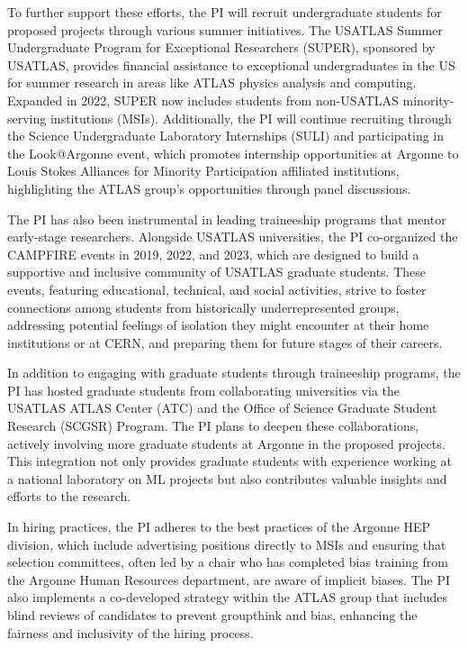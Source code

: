\documentclass[letter, USenglish, 11pt, subfigure]{article}
\begin{document}
To further support these efforts, the PI will recruit undergraduate students for proposed projects through various summer initiatives. The USATLAS Summer Undergraduate Program for Exceptional Researchers (SUPER), sponsored by USATLAS, provides financial assistance to exceptional undergraduates in the US for summer research in areas like ATLAS physics analysis and computing. Expanded in 2022, SUPER now includes students from non-USATLAS minority-serving institutions (MSIs). Additionally, the PI will continue recruiting through the Science Undergraduate Laboratory Internships (SULI) and participating in the Look@Argonne event, which promotes internship opportunities at Argonne to Louis Stokes Alliances for Minority Participation affiliated institutions, highlighting the ATLAS group’s opportunities through panel discussions.

The PI has also been instrumental in leading traineeship programs that mentor early-stage researchers. Alongside USATLAS universities, the PI co-organized the CAMPFIRE events in 2019, 2022, and 2023, which are designed to build a supportive and inclusive community of USATLAS graduate students. These events, featuring educational, technical, and social activities, strive to foster connections among students from historically underrepresented groups, addressing potential feelings of isolation they might encounter at their home institutions or at CERN, and preparing them for future stages of their careers.

In addition to engaging with graduate students through traineeship programs, the PI has hosted graduate students from collaborating universities via the USATLAS ATLAS Center (ATC) and the Office of Science Graduate Student Research (SCGSR) Program. The PI plans to deepen these collaborations, actively involving more graduate students at Argonne in the proposed projects. This integration not only provides graduate students with experience working at a national laboratory on ML projects but also contributes valuable insights and efforts to the research.

In hiring practices, the PI adheres to the best practices of the Argonne HEP division, which include advertising positions directly to MSIs and ensuring that selection committees, often led by a chair who has completed bias training from the Argonne Human Resources department, are aware of implicit biases. The PI also implements a co-developed strategy within the ATLAS group that includes blind reviews of candidates to prevent groupthink and bias, enhancing the fairness and inclusivity of the hiring process.
\end{document}
